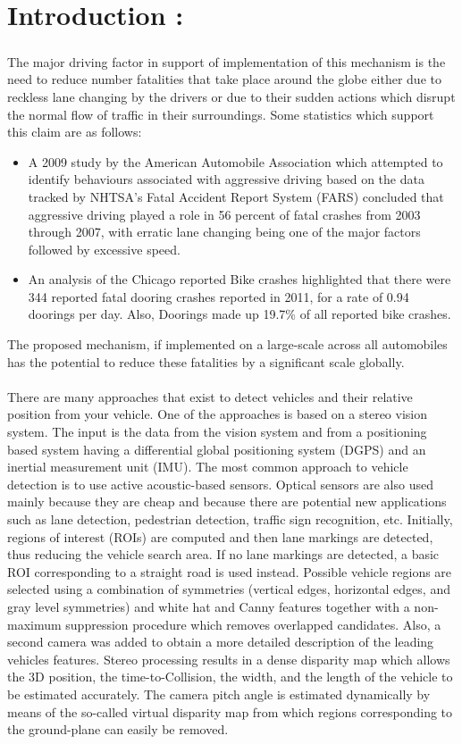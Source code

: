 \documentclass{article}
\begin{document}
	\section*{Introduction :}
	\subparagraph{}
	The major driving factor in support of implementation of this mechanism is the need to reduce number fatalities that take place around the globe either due to reckless lane changing by the drivers or due to their sudden actions which disrupt the normal flow of traffic in their surroundings. Some statistics which support this claim are as follows:
	\begin{itemize}
	\item A 2009 study by the American Automobile Association which attempted to identify behaviours associated with aggressive driving based on the data tracked by NHTSA’s Fatal Accident Report System (FARS) concluded that aggressive driving played a role in 56 percent of fatal crashes from 2003 through 2007, with erratic lane changing being one of the major factors followed by excessive speed.
	\item An analysis of the Chicago reported Bike crashes highlighted that there were 344 reported fatal dooring crashes reported in 2011, for a rate of 0.94 doorings per day. Also, Doorings made up 19.7\% of all reported bike crashes.
	\end{itemize}
	The proposed mechanism, if implemented on a large-scale across all automobiles has the potential to reduce these fatalities by a significant scale globally.\\
	\mbox{} \\
	There are many approaches that exist to detect vehicles and their relative position from your vehicle. One of the approaches is based on a stereo vision system. The input is the data from the vision system and from a positioning based system having a differential global positioning system (DGPS) and an inertial measurement unit (IMU). The most common approach to vehicle detection is to use active acoustic-based sensors. Optical sensors are also used mainly because they are cheap and because there are potential new applications such as lane detection, pedestrian detection, traffic sign recognition, etc. Initially, regions of interest (ROIs) are computed and then lane markings are detected, thus reducing the vehicle search area. If no lane markings are detected, a basic ROI corresponding to a straight road is used instead. Possible vehicle regions are selected using a combination of symmetries (vertical edges, horizontal edges, and gray level symmetries) and white hat and Canny features together with a non-maximum suppression procedure which removes overlapped candidates. Also, a second camera was added to obtain a more detailed description of the leading vehicles features. Stereo processing results in a dense disparity map which allows the 3D position, the time-to-Collision, the width, and the length of the vehicle to be estimated accurately. The camera pitch angle is estimated dynamically by means of the so-called virtual disparity map from which regions corresponding to the ground-plane can easily be removed.
\end{document}
